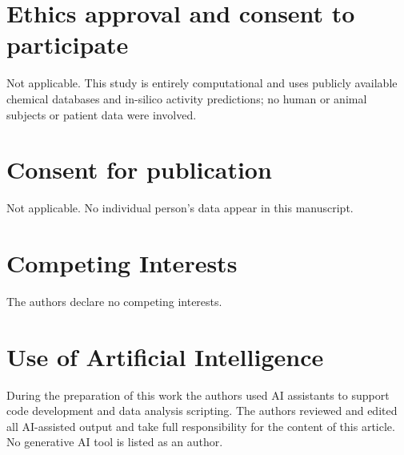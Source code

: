 \documentclass[11pt,a4paper]{article}
\begin{document}
\section*{Ethics approval and consent to participate}

Not applicable. This study is entirely computational and uses publicly available chemical databases and in-silico activity predictions; no human or animal subjects or patient data were involved.

\section*{Consent for publication}

Not applicable. No individual person's data appear in this manuscript.

\section*{Competing Interests}

The authors declare no competing interests.

\section*{Use of Artificial Intelligence}

During the preparation of this work the authors used AI assistants to support code development and data analysis scripting. The authors reviewed and edited all AI-assisted output and take full responsibility for the content of this article. No generative AI tool is listed as an author.




\end{document}
